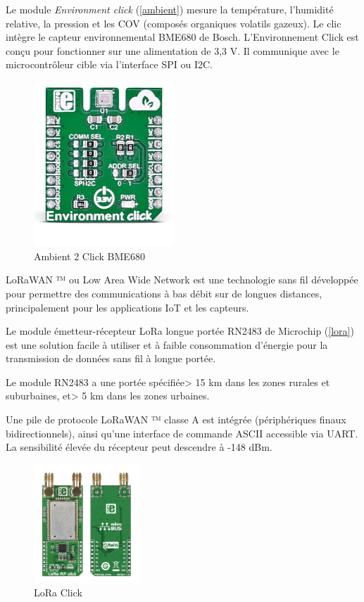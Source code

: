 \documentclass[12pt]{article}
\begin{document}
Le module \textit{Environment click} (\autoref{ambient}) mesure la température, l'humidité relative, la pression et les COV (composés organiques volatils gazeux). Le clic intègre le capteur environnemental BME680 de Bosch. L'Environnement Click est conçu pour fonctionner sur une alimentation de 3,3 V. Il communique avec le microcontrôleur cible via l'interface SPI ou I2C.

\begin{figure}[!h]
	\centering
	\includegraphics[width=200px]{ambient}
	\caption{Ambient 2 Click BME680}
	\label{ambient}
\end{figure}

\newpage
LoRaWAN ™ ou Low Area Wide Network est une technologie sans fil développée pour permettre des communications à bas débit sur de longues distances, principalement pour les applications IoT et les capteurs.

Le module émetteur-récepteur LoRa longue portée RN2483 de Microchip (\autoref{lora}) est une solution facile à utiliser et à faible consommation d'énergie pour la transmission de données sans fil à longue portée.

Le module RN2483 a une portée spécifiée> 15 km dans les zones rurales et suburbaines, et> 5 km dans les zones urbaines.

Une pile de protocole LoRaWAN ™ classe A est intégrée (périphériques finaux bidirectionnels), ainsi qu'une interface de commande ASCII accessible via UART. La sensibilité élevée du récepteur peut descendre à -148 dBm.
\begin{figure}[!h]
	\centering
	\includegraphics[width=150px]{lora}
	\caption{LoRa Click}
	\label{lora}
\end{figure}
\end{document}
